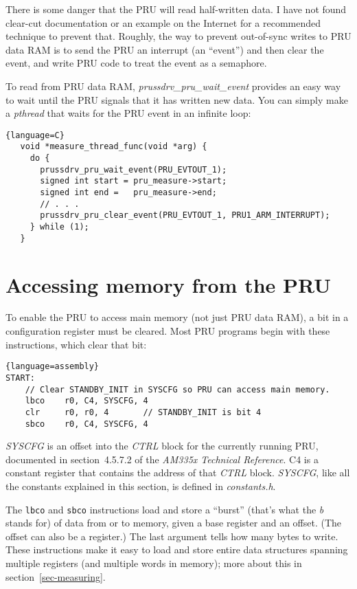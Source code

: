 \documentclass[letterpaper,11pt,fleqn]{article}
\newcommand{\techref}{\textit{AM335x Technical Reference}}
\begin{document}
There is some danger that the PRU will read half-written data. I have not
found clear-cut documentation or an example on the Internet for a recommended
technique to prevent that. Roughly, the way to prevent out-of-sync writes to
PRU data RAM is to send the PRU an interrupt (an ``event'') and then clear the
event, and write PRU code to treat the event as a semaphore.

To read from PRU data RAM, \textit{prussdrv\_pru\_wait\_event} provides an
easy way to wait until the PRU signals that it has written new data. You can
simply make a \textit{pthread} that waits for the PRU event in an infinite
loop:

\begin{lstlisting}{language=C}
   void *measure_thread_func(void *arg) {
     do {
       prussdrv_pru_wait_event(PRU_EVTOUT_1);
       signed int start = pru_measure->start;
       signed int end =   pru_measure->end;
       // . . .
       prussdrv_pru_clear_event(PRU_EVTOUT_1, PRU1_ARM_INTERRUPT);
     } while (1);
   }
\end{lstlisting}

\section{Accessing memory from the PRU}

To enable the PRU to access main memory (not just PRU data RAM), a bit in a
configuration register must be cleared. Most PRU programs begin with these
instructions, which clear that bit:

\begin{lstlisting}{language=assembly}
START:
    // Clear STANDBY_INIT in SYSCFG so PRU can access main memory.
    lbco    r0, C4, SYSCFG, 4
    clr     r0, r0, 4       // STANDBY_INIT is bit 4
    sbco    r0, C4, SYSCFG, 4
\end{lstlisting}

\textit{SYSCFG} is an offset into the \textit{CTRL} block for the currently
running PRU, documented in section~4.5.7.2 of the \techref.  C4 is a constant
register that contains the address of that \textit{CTRL} block.
\textit{SYSCFG}, like all the constants explained in this section, is defined
in \textit{constants.h}.

The \texttt{lbco} and \texttt{sbco} instructions load and store a ``burst''
(that's what the \textit{b} stands for) of data from or to memory, given a
base register and an offset. (The offset can also be a register.) The last
argument tells how many bytes to write.  These instructions make it easy to
load and store entire data structures spanning multiple registers (and
multiple words in memory); more about this in section~\ref{sec-measuring}.
\end{document}
